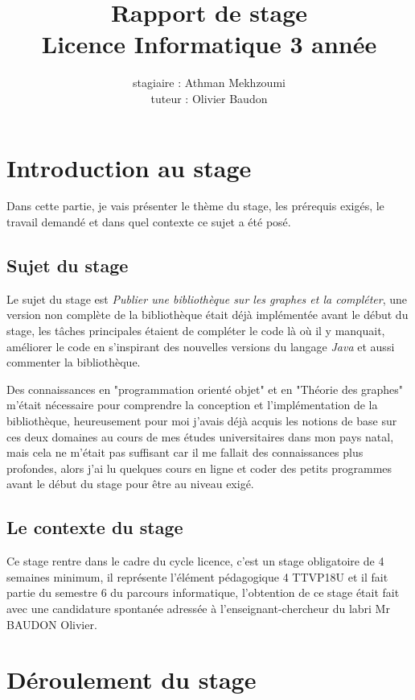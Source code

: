 \documentclass[12pt]{report}
\title{Rapport de stage \\
Licence Informatique 3\up{ème} année}
\author{stagiaire : Athman Mekhzoumi\\
tuteur : Olivier Baudon}
\begin{document}
\newpage
\maketitle
\tableofcontents
\newpage

\chapter{Introduction au stage}

Dans cette partie, je vais présenter le thème du stage, les prérequis exigés, le travail demandé et dans quel contexte ce sujet a été posé.

\section{Sujet du stage}

Le sujet du stage est \textit{Publier une bibliothèque sur les graphes et la compléter}, une version non complète de la bibliothèque était déjà implémentée avant le début du stage, les tâches principales étaient de compléter le code là où il y manquait, améliorer le code en s'inspirant des nouvelles versions du langage \textit{Java} et aussi commenter la bibliothèque.\newline

Des connaissances en "programmation orienté objet" et en "Théorie des graphes" m'était nécessaire pour comprendre la conception et l'implémentation de la bibliothèque, heureusement pour moi j'avais déjà acquis les notions de base sur ces deux domaines au cours de mes études universitaires dans mon pays natal, mais cela ne m'était pas suffisant car il me fallait des connaissances plus profondes, alors j'ai lu quelques cours en ligne et coder des petits programmes avant le début du stage pour être au niveau exigé. 

\section{Le contexte du stage}

Ce stage rentre dans le cadre du cycle licence, c'est un stage obligatoire de 4 semaines minimum, il représente l'élément pédagogique 4 TTVP18U et il fait partie du semestre 6 du parcours informatique, l'obtention de ce stage était fait avec une candidature spontanée adressée à l'enseignant-chercheur du labri Mr BAUDON Olivier.

\newpage
\chapter{Déroulement du stage}
\end{document}
